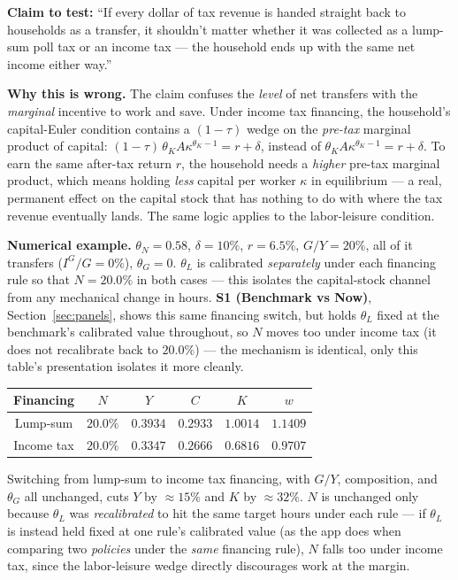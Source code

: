 \documentclass[11pt]{article}
\begin{document}
\textbf{Claim to test:} ``If every dollar of tax revenue is handed straight
back to households as a transfer, it shouldn't matter whether it was
collected as a lump-sum poll tax or an income tax --- the household ends up
with the same net income either way.''

\textbf{Why this is wrong.} The claim confuses the \emph{level} of net
transfers with the \emph{marginal} incentive to work and save. Under income
tax financing, the household's capital-Euler condition contains a
$(1-\tau)$ wedge on the \emph{pre-tax} marginal product of capital:
$(1-\tau)\,\theta_K A \kappa^{\theta_K-1}=r+\delta$, instead of
$\theta_K A \kappa^{\theta_K-1}=r+\delta$. To earn the same after-tax return
$r$, the household needs a \emph{higher} pre-tax marginal product, which
means holding \emph{less} capital per worker $\kappa$ in equilibrium --- a
real, permanent effect on the capital stock that has nothing to do with
where the tax revenue eventually lands. The same logic applies to the
labor-leisure condition.

\begin{casebox}
\textbf{Numerical example.} $\theta_N=0.58$, $\delta=10\%$, $r=6.5\%$,
$G/Y=20\%$, all of it transfers ($I^G/G=0\%$), $\theta_G=0$. $\theta_L$ is
calibrated \emph{separately} under each financing rule so that $N=20.0\%$ in
both cases --- this isolates the capital-stock channel from any mechanical
change in hours. \textbf{S1 (Benchmark vs Now)}, Section~\ref{sec:panels},
shows this same financing switch, but holds $\theta_L$ fixed at the
benchmark's calibrated value throughout, so $N$ moves too under income tax
(it does not recalibrate back to $20.0\%$) --- the mechanism is identical,
only this table's presentation isolates it more cleanly.

\begin{center}
\begin{tabular}{cccccc}
\toprule
Financing & $N$ & $Y$ & $C$ & $K$ & $w$ \\
\midrule
Lump-sum   & $20.0\%$ & $0.3934$ & $0.2933$ & $1.0014$ & $1.1409$ \\
Income tax & $20.0\%$ & $0.3347$ & $0.2666$ & $0.6816$ & $0.9707$ \\
\bottomrule
\end{tabular}
\end{center}

Switching from lump-sum to income tax financing, with $G/Y$, composition,
and $\theta_G$ all unchanged, cuts $Y$ by $\approx 15\%$ and $K$ by
$\approx 32\%$. $N$ is unchanged only because $\theta_L$ was
\emph{recalibrated} to hit the same target hours under each rule --- if
$\theta_L$ is instead held fixed at one rule's calibrated value (as the app
does when comparing two \emph{policies} under the \emph{same} financing
rule), $N$ falls too under income tax, since the labor-leisure wedge
directly discourages work at the margin.
\end{casebox}
\end{document}
